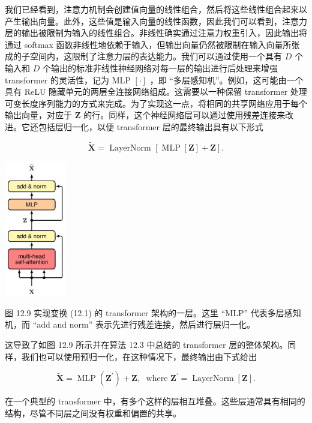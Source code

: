 \documentclass[10pt]{article}
\begin{document}
我们已经看到，注意力机制会创建值向量的线性组合，然后将这些线性组合起来以产生输出向量。此外，这些值是输入向量的线性函数，因此我们可以看到，注意力层的输出被限制为输入的线性组合。非线性确实通过注意力权重引入，因此输出将通过 softmax 函数非线性地依赖于输入，但输出向量仍然被限制在输入向量所张成的子空间内，这限制了注意力层的表达能力。我们可以通过使用一个具有 \(D\) 个输入和 \(D\) 个输出的标准非线性神经网络对每一层的输出进行后处理来增强 transformer 的灵活性，记为 MLP \(\left\lbrack  \cdot \right\rbrack\) ，即 “多层感知机”。例如，这可能由一个具有 ReLU 隐藏单元的两层全连接网络组成。这需要以一种保留 transformer 处理可变长度序列能力的方式来完成。为了实现这一点，将相同的共享网络应用于每个输出向量，对应于 \(\mathbf{Z}\) 的行。同样，这个神经网络层可以通过使用残差连接来改进。它还包括层归一化，以便 transformer 层的最终输出具有以下形式

\[
\widetilde{\mathbf{X}} = \text{ LayerNorm }\left\lbrack  {\operatorname{MLP}\left\lbrack  \mathbf{Z}\right\rbrack   + \mathbf{Z}}\right\rbrack  . \tag{12.22}
\]

\begin{center}
\includegraphics[max width=0.2\textwidth]{images/0194e279-9b28-703a-88f4-c3ac21e2010d_389_1102_358_286_637_0.jpg}
\end{center}
\hspace*{3em} 

图 12.9 实现变换 (12.1) 的 transformer 架构的一层。这里 “MLP” 代表多层感知机，而 “add and norm” 表示先进行残差连接，然后进行层归一化。

这导致了如图 12.9 所示并在算法 12.3 中总结的 transformer 层的整体架构。同样，我们也可以使用预归一化，在这种情况下，最终输出由下式给出

\[
\widetilde{\mathbf{X}} = \operatorname{MLP}\left( {\mathbf{Z}}^{\prime }\right)  + \mathbf{Z},\;\text{ where }{\mathbf{Z}}^{\prime } = \operatorname{LayerNorm}\left\lbrack  \mathbf{Z}\right\rbrack  . \tag{12.23}
\]

在一个典型的 transformer 中，有多个这样的层相互堆叠。这些层通常具有相同的结构，尽管不同层之间没有权重和偏置的共享。
\end{document}
